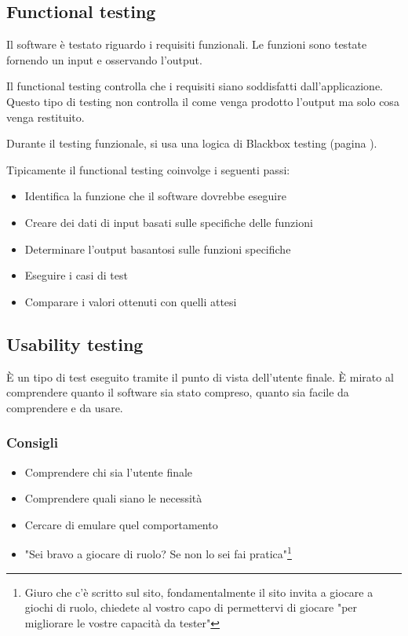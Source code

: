 \documentclass[11pt,a4paper]{book}
\begin{document}
\subsection{Functional testing}
Il software è testato riguardo i requisiti funzionali. Le funzioni sono testate fornendo un input e osservando l'output.

Il functional testing controlla che i requisiti siano soddisfatti dall'applicazione. Questo tipo di testing non controlla il come venga prodotto l'output ma solo cosa venga restituito. 

Durante il testing funzionale, si usa una logica di Blackbox testing (pagina \pageref{par: blackbox}).

Tipicamente il functional testing coinvolge i seguenti passi:
\begin{itemize}
	\item Identifica la funzione che il software dovrebbe eseguire
	\item Creare dei dati di input basati sulle specifiche delle funzioni
	\item Determinare l'output basantosi sulle funzioni specifiche
	\item Eseguire i casi di test
	\item Comparare i valori ottenuti con quelli attesi
\end{itemize}

\subsection{Usability testing}
È un tipo di test eseguito tramite il punto di vista dell'utente finale. È mirato al comprendere quanto il software sia stato compreso, quanto sia facile da comprendere e da usare.

\subsubsection{Consigli}
\begin{itemize}
	\item Comprendere chi sia l'utente finale
	\item Comprendere quali siano le necessità
	\item Cercare di emulare quel comportamento
	\item "Sei bravo a giocare di ruolo? Se non lo sei fai pratica"\footnote{Giuro che c'è scritto sul sito, fondamentalmente il sito invita a giocare a giochi di ruolo, chiedete al vostro capo di permettervi di giocare "per migliorare le vostre capacità da tester"}
\end{itemize}
\end{document}
